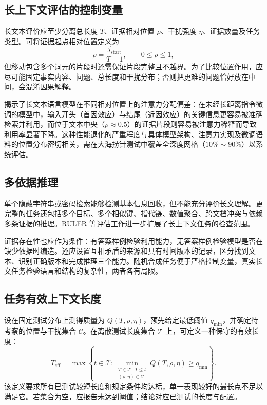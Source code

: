 \documentclass[../textbook.tex]{subfiles}
\begin{document}
\subsection{长上下文评估的控制变量}
长文本评价应至少分离总长度 $T$、证据相对位置 $\rho$、干扰强度 $\eta$、证据数量及任务类型。可将证据起点相对位置定义为
\begin{equation}
 \rho=\frac{j_{\mathrm{start}}}{T-1},\qquad0\le\rho\le1,
\end{equation}
但移动包含多个词元的片段时还需保证片段完整且不越界。为了比较位置作用，应尽可能固定事实内容、问题、总长度和干扰分布；否则把更难的问题恰好放在中间，会混淆因果解释。

揭示了长文本语言模型在不同相对位置上的注意力分配偏差：在未经长距离指令微调的模型中，输入开头（首因效应）与结尾（近因效应）的关键信息更容易被准确检索并利用，而位于文本中央（$\rho \approx 0.5$）的证据片段则容易被注意力稀释而导致利用率显著下降\cite{liu2024lostmiddle}。这种性能退化的严重程度与具体模型架构、注意力实现及微调语料的位置分布密切相关，需在大海捞针测试中覆盖全深度网格（$10\%\sim90\%$）以系统评估。

\subsection{多依据推理}
单个隐蔽字符串或密码检索能够检测基本信息回收，但不能充分评价长文理解。更完整的任务还包括多个目标、多个相似键、指代链、数值聚合、跨文档冲突与依赖多条证据的推理。RULER 等评估工作进一步扩展了长上下文任务的检查范围\cite{hsieh2024ruler}。

证据存在性也应作为条件：有答案样例检验利用能力，无答案样例检验模型是否在缺少依据时编造。还应设置互相矛盾的来源和具有时间版本的记录，区分找到文本、识别正确版本和完成推理三个能力。随机合成任务便于严格控制变量，真实长文任务检验语言和结构的复杂性，两者各有局限。

\subsection{任务有效上下文长度}
设在固定测试分布上测得质量为 $Q(T,\rho,\eta)$，预先给定最低阈值 $q_{\min}$，并确定待考察的位置与干扰集合 $\mathcal C$。在离散测试长度集合 $\mathcal T$ 上，可定义一种保守的有效长度：
\begin{equation}\label{eq:lc-effective}
 T_{\mathrm{eff}}=\max\left\{t\in\mathcal T:
 \min_{\substack{T\in\mathcal T,\ T\le t\\(\rho,\eta)\in\mathcal C}}
 Q(T,\rho,\eta)\ge q_{\min}\right\}.
\end{equation}
该定义要求所有已测试较短长度和规定条件均达标，单一表现较好的最长点不足以满足它。若集合为空，应报告未达到阈值；结论对应已测试的长度与配置。
\end{document}
